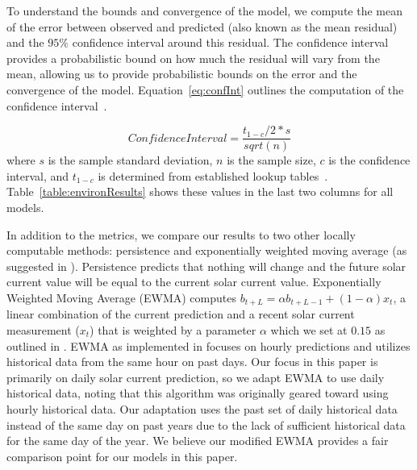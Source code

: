 \documentclass[prodmode,acmtosn]{acmsmall}
\begin{document}
To understand the bounds and convergence of the model, we compute the mean of the error between observed and predicted (also known as the mean residual) and the $95\%$ confidence interval around this residual.
The confidence interval provides a probabilistic bound on how much the residual will vary from the mean, allowing us to provide probabilistic bounds on the error and the convergence of the model.
Equation~\ref{eq:confInt} outlines the computation of the confidence interval~\cite{Ramsay2002StatisticalSlueth}.

\begin{equation}\label{eq:confInt}
  ConfidenceInterval = \frac{t_{1-c}/2*s}{sqrt(n)}
\end{equation}
where $s$ is the sample standard deviation, $n$ is the sample size, $c$ is the confidence interval, and $t_{1-c}$ is determined from established lookup tables~\cite{Ramsay2002StatisticalSlueth}.
Table~\ref{table:environResults} shows these values in the last two columns for all models.

In addition to the metrics, we compare our results to two other locally computable methods: persistence and exponentially weighted moving average (as suggested in \cite{hsuISPLED2006,kansalDAC2006}).
Persistence predicts that nothing will change and the future solar current value will be equal to the current solar current value.
Exponentially Weighted Moving Average (EWMA) computes \mbox{$b_{t+L}=\alpha b_{t+L-1}+(1-\alpha)x_{t}$}, a linear combination of the current prediction and a recent solar current measurement ($x_{t}$) that is weighted by a parameter $\alpha$ which we set at $0.15$ as outlined in \cite{hsuISPLED2006}.
EWMA as implemented in \cite{hsuISPLED2006,kansalDAC2006} focuses on hourly predictions and utilizes historical data from the same hour on past days.  Our focus in this paper is primarily on daily solar current prediction, so we    adapt EWMA  to use  daily  historical data, noting that this algorithm was originally geared toward using hourly historical data.  Our adaptation uses the past set of daily historical data instead of the same day on past years due to the lack of sufficient historical data for the same day of the year. We believe our modified EWMA provides a fair comparison point for our models in this paper.
\end{document}
